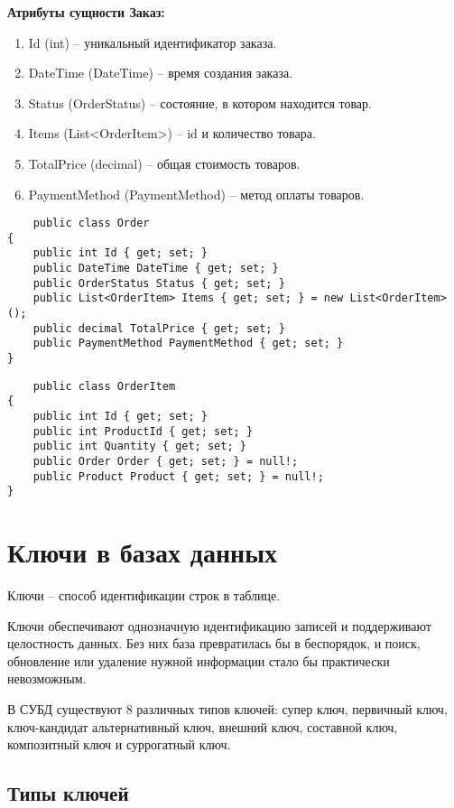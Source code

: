 \documentclass[a4paper,12pt]{report}
\begin{document}
\textbf{Атрибуты сущности Заказ:}
\begin{enumerate}
    \item
        Id (int) -- уникальный идентификатор заказа.
    \item
        DateTime (DateTime) -- время создания заказа.
    \item
        Status (OrderStatus) -- состояние, в котором находится товар.
    \item
        Items (List<OrderItem>) -- id и количество товара.
    \item
        TotalPrice (decimal) -- общая стоимость товаров.
    \item
        PaymentMethod (PaymentMethod) -- метод оплаты товаров.
\end{enumerate}

\begin{verbatim}
    public class Order
{
    public int Id { get; set; }
    public DateTime DateTime { get; set; }
    public OrderStatus Status { get; set; }
    public List<OrderItem> Items { get; set; } = new List<OrderItem>();
    public decimal TotalPrice { get; set; }
    public PaymentMethod PaymentMethod { get; set; }
}
\end{verbatim}

\begin{verbatim}
    public class OrderItem
{
    public int Id { get; set; }
    public int ProductId { get; set; }
    public int Quantity { get; set; }
    public Order Order { get; set; } = null!;
    public Product Product { get; set; } = null!;
}
\end{verbatim}

\section{Ключи в базах данных}

Ключи -- способ идентификации строк в таблице.

Ключи обеспечивают однозначную идентификацию записей и поддерживают целостность данных. 
Без них база превратилась бы в беспорядок, и поиск, обновление или удаление нужной 
информации стало бы практически невозможным.

В СУБД существуют 8 различных типов ключей: супер ключ, первичный ключ, ключ-кандидат
альтернативный ключ, внешний ключ, составной ключ, композитный ключ и суррогатный ключ.

\subsection{Типы ключей}
\end{document}
